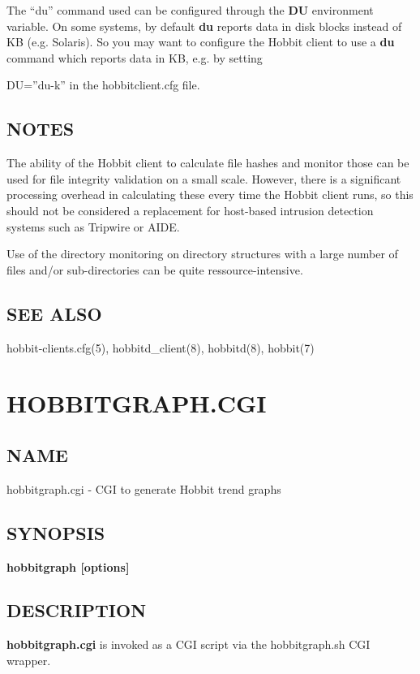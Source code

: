   The ``du'' command used can be configured through the \textbf{DU}
 environment variable. On some systems, by default \textbf{du}
 reports data in disk blocks instead of KB (e.g. Solaris). So you may want to configure the Hobbit client to use a \textbf{du}
 command which reports data in KB, e.g. by setting  
 
DU=''du-k''  
 in the hobbitclient.cfg file. 


 
\subsection{NOTES}
 The ability of the Hobbit client to calculate file hashes and monitor
 those can be used for file integrity validation on a small
 scale. However, there is a significant processing overhead in
 calculating these every time the Hobbit client runs, so this should
 not be considered a replacement for host-based intrusion detection
 systems such as Tripwire or AIDE. 


  Use of the directory monitoring on directory structures with a large number of files and/or sub-directories can be quite ressource-intensive. 


 
\subsection{SEE ALSO}
hobbit-clients.cfg(5), hobbitd\_client(8), hobbitd(8), hobbit(7) 

 

%
\newpage
\section{HOBBITGRAPH.CGI}
\subsection{NAME}
 hobbitgraph.cgi - CGI to generate Hobbit trend graphs 
\subsection{SYNOPSIS}
\textbf{hobbitgraph [options]}


 
\subsection{DESCRIPTION}
\textbf{hobbitgraph.cgi}
 is invoked as a CGI script via the hobbitgraph.sh CGI wrapper. 


